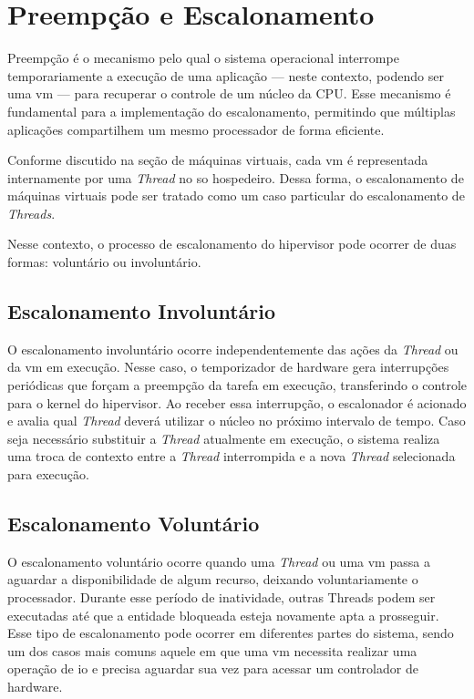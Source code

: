 \section{Preempção e Escalonamento}

Preempção é o mecanismo pelo qual o sistema operacional interrompe temporariamente a execução de uma aplicação — neste contexto, podendo ser uma \gls{vm} — para recuperar o
controle de um núcleo da CPU. Esse mecanismo é fundamental para a implementação do escalonamento, permitindo que múltiplas aplicações compartilhem um mesmo processador de forma eficiente.

Conforme discutido na seção de máquinas virtuais, cada \gls{vm} é representada internamente por uma \textit{Thread} no \gls{so} hospedeiro.
Dessa forma, o escalonamento de máquinas virtuais pode ser tratado como um caso particular do escalonamento de \textit{Threads}.

Nesse contexto, o processo de escalonamento do hipervisor pode ocorrer de duas formas: voluntário ou involuntário.

\subsection{Escalonamento Involuntário}

O escalonamento involuntário ocorre independentemente das ações da \textit{Thread} ou da \gls{vm} em execução. Nesse caso, o temporizador de hardware gera interrupções periódicas
que forçam a preempção da tarefa em execução, transferindo o controle para o kernel do hipervisor.
Ao receber essa interrupção, o escalonador é acionado e avalia qual \textit{Thread} deverá utilizar o núcleo no próximo intervalo de tempo. Caso seja necessário substituir a
\textit{Thread} atualmente em execução, o sistema realiza uma troca de contexto entre a \textit{Thread} interrompida e a nova \textit{Thread} selecionada para execução.

\subsection{Escalonamento Voluntário}

O escalonamento voluntário ocorre quando uma \textit{Thread} ou uma \gls{vm} passa a aguardar a disponibilidade de algum recurso, deixando voluntariamente o processador.
Durante esse período de inatividade, outras Threads podem ser executadas até que a entidade bloqueada esteja novamente apta a prosseguir. Esse tipo de escalonamento pode
ocorrer em diferentes partes do sistema, sendo um dos casos mais comuns aquele em que uma \gls{vm} necessita realizar uma operação de \gls{io} e precisa aguardar sua vez para acessar um
controlador de hardware.

